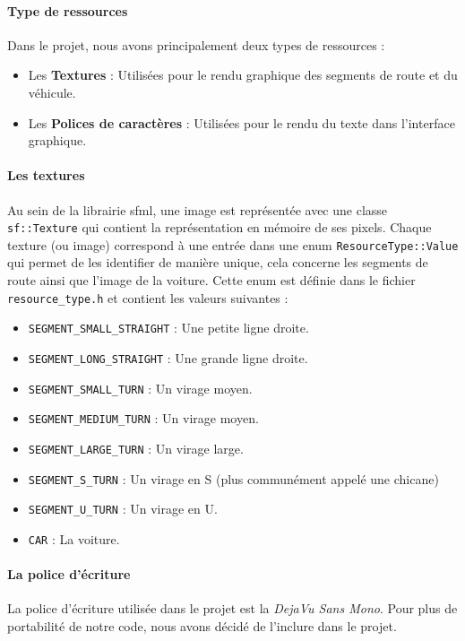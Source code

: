 \paragraph{Type de ressources}
Dans le projet, nous avons principalement deux types de ressources :
\begin{itemize}
    \item Les \textbf{Textures} : Utilisées pour le rendu graphique des segments de route et du véhicule.
    \item Les \textbf{Polices de caractères} : Utilisées pour le rendu du texte dans l'interface graphique.
\end{itemize}

\paragraph{Les textures}
Au sein de la librairie \gls{sfml}, une image est représentée avec une classe \texttt{sf::Texture}\cite{sfml_sf_texture} qui contient la représentation en mémoire de ses pixels.
Chaque texture (ou image) correspond à une entrée dans une enum \texttt{ResourceType::Value} qui permet de les identifier de manière unique, cela concerne les segments de route ainsi que l'image de la voiture.
Cette enum est définie dans le fichier \texttt{resource\_type.h} et contient les valeurs suivantes :
\begin{itemize}
    \item \texttt{SEGMENT\_SMALL\_STRAIGHT} : Une petite ligne droite.
    \item \texttt{SEGMENT\_LONG\_STRAIGHT} : Une grande ligne droite.
    \item \texttt{SEGMENT\_SMALL\_TURN} : Un virage moyen.
    \item \texttt{SEGMENT\_MEDIUM\_TURN} : Un virage moyen.
    \item \texttt{SEGMENT\_LARGE\_TURN} : Un virage large.
    \item \texttt{SEGMENT\_S\_TURN} : Un virage en S (plus communément appelé une chicane)
    \item \texttt{SEGMENT\_U\_TURN} : Un virage en U\@.
    \item \texttt{CAR} : La voiture.
\end{itemize}

\paragraph{La police d'écriture}
La police d'écriture utilisée dans le projet est la \textit{DejaVu Sans Mono}.
Pour plus de portabilité de notre code, nous avons décidé de l'inclure dans le projet.

